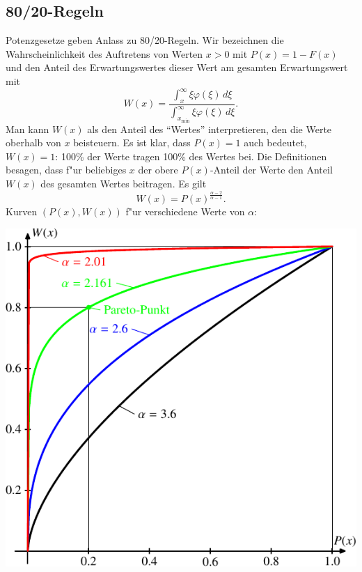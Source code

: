 \subsection{80/20-Regeln}
Potenzgesetze geben Anlass zu 80/20-Regeln.
Wir bezeichnen die Wahrscheinlichkeit des Auftretens von Werten $x>0$ 
mit $P(x)=1-F(x)$ und den Anteil des Erwartungswertes dieser Wert
am gesamten Erwartungswert  mit
\[
W(x)=\frac{\int_x^\infty \xi\varphi(\xi)\,d\xi}{\int_{x_{\text{min}}}^\infty \xi\varphi(\xi)\,d\xi}.
\]
Man kann $W(x)$ als den Anteil des ``Wertes'' interpretieren,
den die Werte oberhalb von $x$ beisteuern.
Es ist klar, dass $P(x)=1$ auch bedeutet, $W(x)=1$: 100\% der Werte
tragen 100\% des Wertes bei.
Die Definitionen besagen, dass f"ur beliebiges $x$ der obere $P(x)$-Anteil
der Werte den Anteil $W(x)$ des gesamten Wertes beitragen.
Es gilt
\[
W(x)= P(x)^{\frac{\alpha-2}{\alpha-1}}.
\]
Kurven $(P(x),W(x))$ f"ur verschiedene Werte von $\alpha$:
\begin{center}
\includegraphics{images/power-4.pdf}
\end{center}

